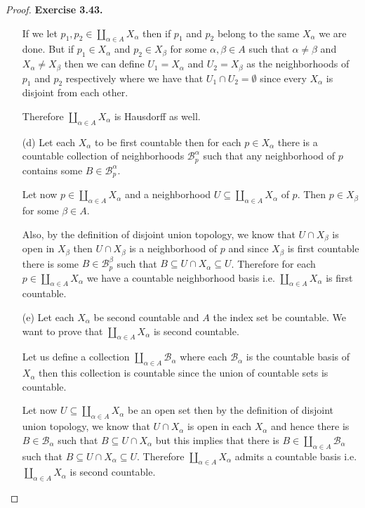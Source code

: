 \documentclass[11pt]{article}
\theoremstyle{definition}
\begin{document}
\begin{proof}{\textbf{Exercise 3.43.}}
\begin{itemize}
        If we let $p_1, p_2 \in \coprod_{\alpha \in A} X_\alpha$ then if 
        $p_1$ and $p_2$ belong to the same $X_\alpha$ we are done. But if
        $p_1 \in X_\alpha$ and $p_2 \in X_\beta$ for some $\alpha, \beta \in A$
        such that $\alpha \neq \beta$ and $X_\alpha \neq X_\beta$ then
        we can define $U_1 = X_\alpha$ and $U_2 = X_\beta$ as the neighborhoods
        of $p_1$ and $p_2$ respectively where we have that
        $U_1 \cap U_2 = \emptyset$ since every $X_\alpha$ is disjoint from each
        other.

        Therefore $\coprod_{\alpha \in A} X_\alpha$ is Hausdorff as well.

        \item [(d)] Let each $X_\alpha$ to be first countable then for each 
        $p \in X_\alpha$ there is a countable collection of neighborhoods
        $\mathcal{B}_p^\alpha$ such that any neighborhood of $p$ contains some
        $B \in \mathcal{B}_p^\alpha$.

        Let now $p \in \coprod_{\alpha \in A} X_\alpha$ and a neighborhood 
        $U \subseteq \coprod_{\alpha \in A} X_\alpha$ of $p$.
        Then $p \in X_\beta$ for some $\beta \in A$.

        Also, by the definition of disjoint union topology, we know that
        $U \cap X_\beta$ is open in $X_\beta$ then $U \cap X_\beta$ is 
        a neighborhood of $p$ and since $X_\beta$ is first
        countable there is some $B \in \mathcal{B}_p^\beta$ such that
        $B \subseteq U\cap X_\alpha \subseteq U$. Therefore for each
        $p \in \coprod_{\alpha \in A} X_\alpha$ we have a countable
        neighborhood basis i.e. $\coprod_{\alpha \in A} X_\alpha$
        is first countable.

        \item [(e)] Let each $X_\alpha$ be second countable and $A$ the index
        set be countable. We want to prove that
        $\coprod_{\alpha \in A} X_\alpha$ is second countable.

        Let us define a collection $\coprod_{\alpha \in A} \mathcal{B}_\alpha$
        where each $\mathcal{B}_\alpha$ is the countable basis of $X_\alpha$
        then this collection is countable since the union of countable sets
        is countable.

        Let now $U \subseteq \coprod_{\alpha \in A} X_\alpha$ be an open set
        then by the definition of disjoint union topology, we know that
        $U \cap X_\alpha$ is open in each $X_\alpha$ and hence there is
        $B \in \mathcal{B}_\alpha$ such that $B \subseteq U \cap X_\alpha$
        but this implies that there is
        $B \in \coprod_{\alpha \in A} \mathcal{B}_\alpha$ such that
        $B \subseteq U \cap X_\alpha \subseteq U$.
        Therefore $\coprod_{\alpha \in A} X_\alpha$ admits a countable basis
        i.e. $\coprod_{\alpha \in A} X_\alpha$ is second countable.
    \end{itemize}
\end{proof}
\end{document}
